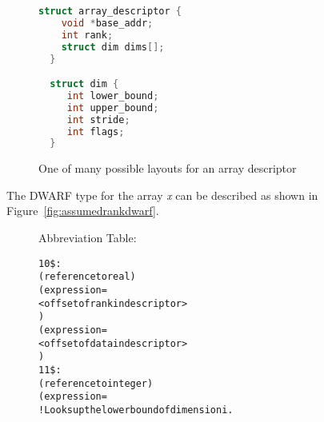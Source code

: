 \begin{figure}[!h]
\begin{lstlisting}[language=C]
  struct array_descriptor {
    void *base_addr;
    int rank;
    struct dim dims[]; 
  }

  struct dim {
     int lower_bound;
     int upper_bound;
     int stride;
     int flags;
  }
\end{lstlisting}
\caption{One of many possible layouts for an array descriptor}
\label{fig:arraydesc}
\end{figure}

The DWARF type for the array \emph{x} can be described as shown in
Figure~\ref{fig:assumedrankdwarf}.

\begin{figure}[!h]
\begin{minipage}[t]{\linewidth}
\centering
Abbreviation Table: \dotdebugabbrev{}
\begin{framed}
\scriptsize
\begin{alltt}
10\$:  \DWTAGarraytype
         (reference to real)
         (expression=
             <offset of rank in descriptor>
             )
         (expression=
             <offset of data in descriptor>
             )
11\$:    \DWTAGgenericsubrange
             (reference to integer)
             (expression=
             !   Looks up the lower bound of dimension i.
      

\end{alltt}
\end{framed}
\end{minipage}
\end{figure}
